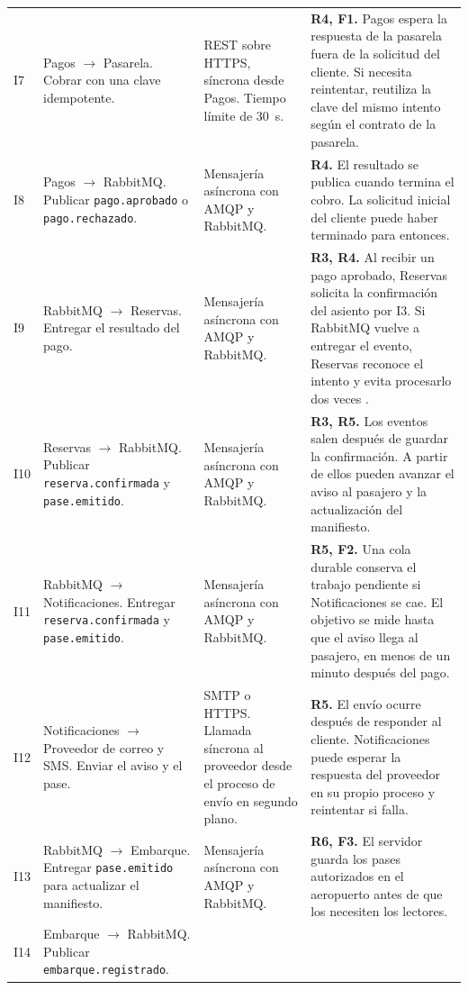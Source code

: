 \documentclass[11pt,a4paper]{article}
\newcommand{\flecha}{\(\to\)}
\begin{document}
{\begin{longtable}{@{}P{0.75cm}P{4.25cm}P{4.1cm}P{7.2cm}@{}}
\addlinespace
I7 & Pagos \flecha{} Pasarela. Cobrar con una clave idempotente.
& REST sobre HTTPS, síncrona desde Pagos. Tiempo límite de 30~s.
& \textbf{R4, F1.} Pagos espera la respuesta de la pasarela fuera de la solicitud del cliente. Si necesita reintentar, reutiliza la clave del mismo intento según el contrato de la pasarela. \\
\addlinespace
I8 & Pagos \flecha{} RabbitMQ. Publicar \texttt{pago.aprobado} o \texttt{pago.rechazado}.
& Mensajería asíncrona con AMQP y RabbitMQ.
& \textbf{R4.} El resultado se publica cuando termina el cobro. La solicitud inicial del cliente puede haber terminado para entonces. \\
\addlinespace
I9 & RabbitMQ \flecha{} Reservas. Entregar el resultado del pago.
& Mensajería asíncrona con AMQP y RabbitMQ.
& \textbf{R3, R4.} Al recibir un pago aprobado, Reservas solicita la confirmación del asiento por I3. Si RabbitMQ vuelve a entregar el evento, Reservas reconoce el intento y evita procesarlo dos veces \cite{confirms}. \\
\addlinespace
I10 & Reservas \flecha{} RabbitMQ. Publicar \texttt{reserva.confirmada} y \texttt{pase.emitido}.
& Mensajería asíncrona con AMQP y RabbitMQ.
& \textbf{R3, R5.} Los eventos salen después de guardar la confirmación. A partir de ellos pueden avanzar el aviso al pasajero y la actualización del manifiesto. \\
\addlinespace
I11 & RabbitMQ \flecha{} Notificaciones. Entregar \texttt{reserva.confirmada} y \texttt{pase.emitido}.
& Mensajería asíncrona con AMQP y RabbitMQ.
& \textbf{R5, F2.} Una cola durable conserva el trabajo pendiente si Notificaciones se cae. El objetivo se mide hasta que el aviso llega al pasajero, en menos de un minuto después del pago. \\
\addlinespace
I12 & Notificaciones \flecha{} Proveedor de correo y SMS. Enviar el aviso y el pase.
& SMTP o HTTPS. Llamada síncrona al proveedor desde el proceso de envío en segundo plano.
& \textbf{R5.} El envío ocurre después de responder al cliente. Notificaciones puede esperar la respuesta del proveedor en su propio proceso y reintentar si falla. \\
\addlinespace
I13 & RabbitMQ \flecha{} Embarque. Entregar \texttt{pase.emitido} para actualizar el manifiesto.
& Mensajería asíncrona con AMQP y RabbitMQ.
& \textbf{R6, F3.} El servidor guarda los pases autorizados en el aeropuerto antes de que los necesiten los lectores. \\
\addlinespace
I14 & Embarque \flecha{} RabbitMQ. Publicar \texttt{embarque.registrado}.

\end{longtable}}
\end{document}
